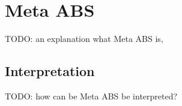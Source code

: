\section{Meta ABS}
TODO: an explanation what Meta ABS is, 

\subsection{Interpretation}
TODO: how can be Meta ABS be interpreted?